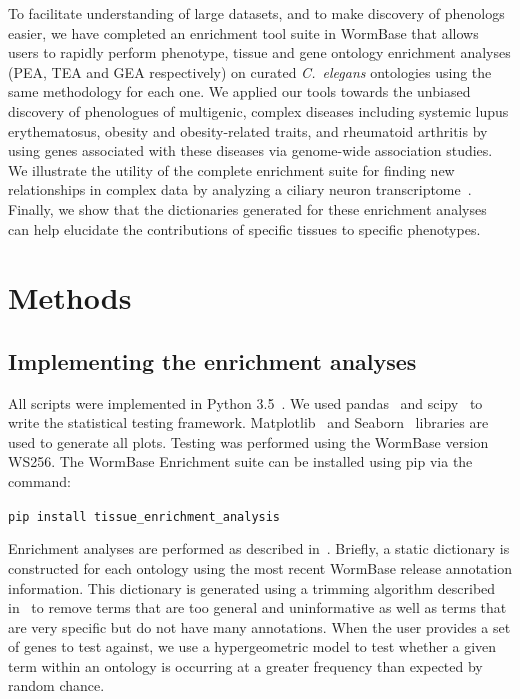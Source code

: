 \documentclass[10pt,letterpaper,twocolumn]{article}
\newcommand{\cel}{\emph{C.~elegans}}
\begin{document}
To facilitate understanding of large datasets, and to make discovery of
phenologs easier, we have completed an enrichment tool suite in WormBase
that allows users to rapidly perform phenotype, tissue and gene ontology
enrichment analyses (PEA, TEA and GEA respectively) on curated \cel{} ontologies
using the same methodology for each one.
We applied our tools towards the unbiased discovery of phenologues of
multigenic, complex diseases including
systemic lupus erythematosus, obesity and obesity-related traits,  and
rheumatoid arthritis
by using genes associated with these
diseases via genome-wide association studies. We illustrate the utility of
the complete enrichment suite for finding new relationships in complex data by
analyzing a ciliary neuron transcriptome~\cite{Wang2015}. Finally, we show that
the dictionaries generated for these enrichment analyses can help elucidate the
contributions of specific tissues to specific phenotypes.

\section*{Methods}
\subsection*{Implementing the enrichment analyses}
All scripts were implemented in Python 3.5~\cite{Rossum2011}. We used
pandas~\cite{McKinney2011} and scipy~\cite{Oliphant2007} to write the
statistical testing framework. Matplotlib~\cite{Hunter2007} and Seaborn~\cite{Waskom}
libraries are used to generate all plots. Testing was performed using the
WormBase version WS256. The WormBase Enrichment suite can be installed using
pip via the command:

\texttt{pip install tissue\_enrichment\_analysis}

Enrichment analyses are performed as described in~\cite{Angeles-Albores2016}.
Briefly, a static dictionary is constructed for each ontology using the
most recent WormBase release annotation information. This dictionary is generated
using a trimming algorithm described in~\cite{Angeles-Albores2016} to remove
terms that are too general and uninformative as well as terms that are very
specific but do not have many annotations. When the user provides a set of genes
to test against, we use a hypergeometric model to test whether a given term within
an ontology is occurring at a greater frequency than expected by random chance.
\end{document}
